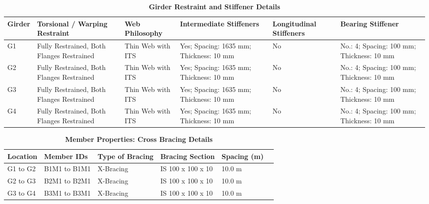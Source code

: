 \documentclass[12pt,a4paper]{report}
\numberwithin{table}{chapter}
\numberwithin{figure}{chapter}
\begin{document}
\vspace{4pt}
\begin{longtable}{|L{1.4cm}|p{2.2cm}|p{2.2cm}|p{3.0cm}|p{2.4cm}|p{2.2cm}|}
\caption{\textbf{Girder Restraint and Stiffener Details}}\\
\hline
\textbf{Girder} & \textbf{Torsional / Warping Restraint} & \textbf{Web Philosophy} & \textbf{Intermediate Stiffeners} & \textbf{Longitudinal Stiffeners} & \textbf{Bearing Stiffener} \\[6pt]
\hline
\endfirsthead
\endhead

G1 & Fully Restrained, Both Flanges Restrained & Thin Web with ITS & Yes; Spacing: 1635 mm; Thickness: 10 mm & No & No.: 4; Spacing: 100 mm; Thickness: 10 mm \\[8pt]
\hline
G2 & Fully Restrained, Both Flanges Restrained & Thin Web with ITS & Yes; Spacing: 1635 mm; Thickness: 10 mm & No & No.: 4; Spacing: 100 mm; Thickness: 10 mm \\[8pt]
\hline
G3 & Fully Restrained, Both Flanges Restrained & Thin Web with ITS & Yes; Spacing: 1635 mm; Thickness: 10 mm & No & No.: 4; Spacing: 100 mm; Thickness: 10 mm \\[8pt]
\hline
G4 & Fully Restrained, Both Flanges Restrained & Thin Web with ITS & Yes; Spacing: 1635 mm; Thickness: 10 mm & No & No.: 4; Spacing: 100 mm; Thickness: 10 mm \\[8pt]
\hline
\end{longtable}



\newpage

\vspace{0.4em}
\setlength{\tabcolsep}{4pt}
\setlength\LTleft{0pt}
\setlength\LTright{\fill}

\begin{longtable}{|L{2.2cm}|L{2.2cm}|L{3.0cm}|L{2.5cm}|C{1.8cm}|C{1.8cm}|}
\caption{\textbf{Member Properties: Cross Bracing Details}}
\hline
\textbf{Location} & \textbf{Member IDs} & \textbf{Type of Bracing} & \textbf{Bracing Section} & \textbf{Spacing (m)} \\
\hline
G1 to G2 & B1M1 to B1M1 & X-Bracing & IS 100 x 100 x 10 & 10.0 m \\[6pt]
\hline
G2 to G3 & B2M1 to B2M1 & X-Bracing & IS 100 x 100 x 10 & 10.0 m \\[6pt]
\hline
G3 to G4 & B3M1 to B3M1 & X-Bracing & IS 100 x 100 x 10 & 10.0 m \\[6pt]
\hline
\end{longtable}

\vspace{0.4em}
\noindent
\setlength{\tabcolsep}{4pt}
\setlength\LTleft{0pt}
\setlength\LTright{\fill}
\end{document}
